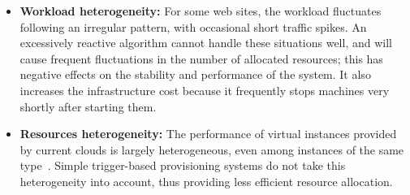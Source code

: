 \begin{itemize}
\item \textbf{Workload heterogeneity:} For some web sites, the
  workload fluctuates following an irregular pattern, with occasional
  short traffic spikes. An excessively reactive algorithm cannot
  handle these situations well, and will cause frequent fluctuations
  in the number of allocated resources; this has negative effects on
  the stability and performance of the system. It also increases the
  infrastructure cost because it frequently stops machines very
  shortly after starting them.






\item \textbf{Resources heterogeneity:} The performance of virtual
  instances provided by current clouds is largely heterogeneous, even
  among instances of the same type~\cite{ec2Performance}.  Simple
  trigger-based provisioning systems do not take this heterogeneity
  into account, thus providing less efficient resource allocation.


\end{itemize}


